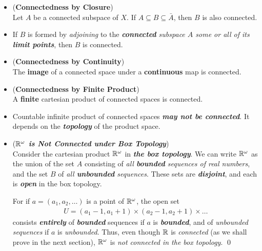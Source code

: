 \documentclass[11pt]{article}
\begin{document}
\begin{itemize}
\item \begin{proposition} (\textbf{Connectedness by Closure})\citep{munkres2000topology} \\
Let $A$ be a connected subspace of $X$. If $A \subseteq B \subseteq  \bar{A}$, then $B$ is also connected.
\end{proposition}

\item \begin{remark}
If $B$ is formed by \emph{adjoining} to the \emph{\textbf{connected} subspace $A$ some or all of its \textbf{limit points}}, then $B$ is connected.
\end{remark}

\item \begin{proposition}  (\textbf{Connectedness by Continuity}) \citep{munkres2000topology} \\
The \textbf{image} of a connected space under a \textbf{continuous} map is connected.
\end{proposition}

\item \begin{proposition}  (\textbf{Connectedness by Finite Product}) \citep{munkres2000topology} \\
A \textbf{finite} cartesian product of connected spaces is connected.
\end{proposition}

\item \begin{remark}
Countable infinite product of connected spaces \emph{\textbf{may not be connected}}. It depends on the \emph{\textbf{topology}} of the product space.
\end{remark}

\item \begin{example} (\emph{\textbf{${\mathbb R}^{\omega}$ is Not Connected under Box Topology}})\\
Consider the cartesian product ${\mathbb R}^{\omega}$ in \emph{\textbf{the box topology}}. We can write ${\mathbb R}^{\omega}$ as the union of the set $A$ consisting of \emph{all \textbf{bounded} sequences of real numbers}, and the set $B$ of \emph{all \textbf{unbounded} sequences}. These sets are \emph{\textbf{disjoint}}, and each is \emph{\textbf{open}} in the box topology.

For if $a = (a_1, a_2, \ldots)$ is a point of ${\mathbb R}^{\omega}$, the open set
\begin{align*}
U = (a_1 - 1, a_1 + 1) \times (a_2 - 1, a_2 + 1) \times \ldots
\end{align*}
consists \textbf{\emph{entirely}} of \textbf{\emph{bounded}} sequences if $a$ is \emph{\textbf{bounded}}, and of \emph{unbounded sequences} if $a$ is \emph{unbounded}. Thus, even though ${\mathbb R}$ is \emph{connected} (as we shall prove in the next section),  ${\mathbb R}^{\omega}$ is \emph{not connected in the box topology}. \qed
\end{example}


\end{itemize}
\end{document}
